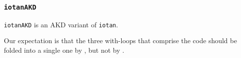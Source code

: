 \subsubsection{\tt iotanAKD}
\label{benchmarkiotanAKD}

{\tt iotanAKD} is an AKD variant of {\tt iotan}.

Our expectation is that the three with-loops that comprise the
code should be folded into a single one by \awlf, but
not by \wlf.

